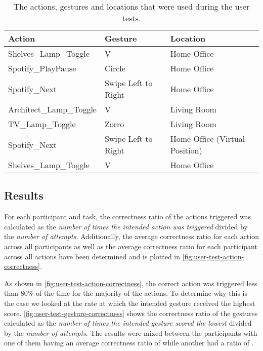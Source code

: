 \begin{table}[]
\centering
\begin{tabular}{|l|l|l|}
\hline
Action                  & Gesture             & Location                       \\ \hline
Shelves\_Lamp\_Toggle   & V                   & Home Office                    \\ \hline
Spotify\_PlayPause      & Circle              & Home Office                    \\ \hline
Spotify\_Next           & Swipe Left to Right & Home Office                    \\ \hline
Architect\_Lamp\_Toggle & V                   & Living Room                    \\ \hline
TV\_Lamp\_Toggle        & Zorro               & Living Room                    \\ \hline
Spotify\_Next           & Swipe Left to Right & Home Office (Virtual Position) \\ \hline
Shelves\_Lamp\_Toggle   & V                   & Home Office                    \\ \hline
\end{tabular}
\caption{The actions, gestures and locations that were used during the user tests.}
\label{table:user-test-tasks}
\end{table}

\subsection{Results}
\label{sec:evaluation:user-tests-results}

For each participant and task, the correctness ratio of the actions triggered was calculated as the \emph{number of times the intended action was triggered} divided by
the \emph{number of attempts}.
Additionally, the average correctness ratio for each action across all participants as well as the average correctness ratio for each participant across
all actions have been determined and is plotted in \cref{fig:user-test-action-correctness}.

As shown in \cref{fig:user-test-action-correctness}, the correct action was triggered less than 80\% of the time for the majority of the actions.
To determine why this is the case we looked at the rate at which the intended gesture received the highest score.
\cref{fig:user-test-gesture-correctness} shows the correctness ratio of the gestures calculated as the \emph{number of times the intended gesture scored the lowest} divided by
the \emph{number of attempts}.
The results were mixed between the participants with one of them having an average correctness ratio of  while another had a ratio of .

